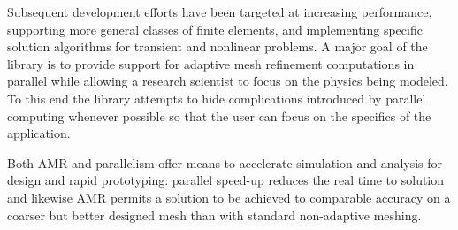 \documentclass[global,twocolumn,final]{svjour}
\begin{document}
Subsequent development efforts have been targeted at increasing
performance, supporting more general classes of finite elements, and
implementing specific solution algorithms for transient and nonlinear
problems.  A major goal of the library is to provide support for
adaptive mesh refinement computations in parallel while allowing a
research scientist to focus on the physics being modeled.  To this
end the library attempts to hide complications introduced by parallel
computing whenever possible so that the user can focus on the
specifics of the application.

Both AMR and parallelism offer means to accelerate simulation and
analysis for design and rapid prototyping: parallel speed-up reduces
the real time to solution and likewise AMR permits a solution to be
achieved to comparable accuracy on a coarser but better designed mesh
than with standard non-adaptive meshing.
\end{document}
